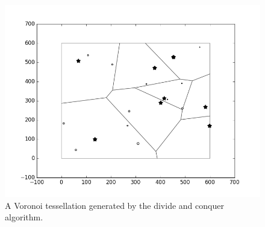 \begin{figure}[H]
\includegraphics[width=\textwidth]{Images/recentre1.png}
\caption{A Voronoi tessellation generated by the divide and conquer algorithm.}
\label{fig:gen_voronoi}
\end{figure}
